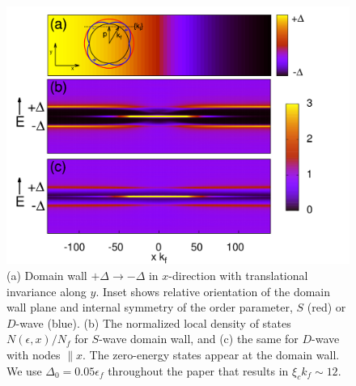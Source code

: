 \documentclass[prb,aps,showpacs,amsmath,twocolumn,10pt]{revtex4-1}
\begin{document}
\begin{figure}
\includegraphics[scale=0.21]{./Fig1}
\caption{\label{fig:1}
(a) Domain wall $+\Delta \to -\Delta$ in $x$-direction with translational
invariance along $y$. Inset shows relative orientation of the domain wall plane 
and internal symmetry of the order parameter, $S$ (red) or $D$-wave (blue). 
(b) The normalized local density of states $N(\epsilon,x)/N_f$ for $S$-wave domain wall, and  
(c) the same for $D$-wave with nodes $\parallel x$. The zero-energy states appear at the domain wall. 
We use $\Delta_0=0.05\epsilon_f$ throughout the paper that results in $\xi_c k_f \sim 12$.  
} 
\end{figure}

\end{document}
